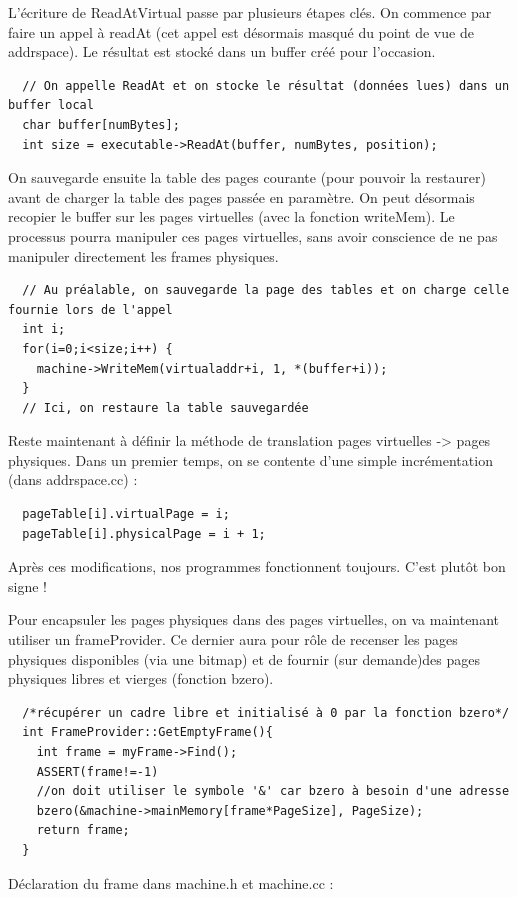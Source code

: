 \documentclass[a4paper,10pt]{article}
\begin{document}
  L'écriture de ReadAtVirtual passe par plusieurs étapes clés. On commence par faire un appel à readAt (cet appel est désormais masqué du point de vue de addrspace). Le résultat est stocké dans un buffer créé pour l'occasion.

  \begin{lstlisting}
  // On appelle ReadAt et on stocke le résultat (données lues) dans un buffer local
  char buffer[numBytes];
  int size = executable->ReadAt(buffer, numBytes, position);
  \end{lstlisting}

  On sauvegarde ensuite la table des pages courante (pour pouvoir la restaurer) avant de charger la table des pages passée en paramètre. On peut désormais recopier le buffer sur les pages virtuelles (avec la fonction writeMem). Le processus pourra manipuler ces pages virtuelles, sans avoir conscience de ne pas manipuler directement les frames physiques.

  \begin{lstlisting}
  // Au préalable, on sauvegarde la page des tables et on charge celle fournie lors de l'appel
  int i;
  for(i=0;i<size;i++) {
    machine->WriteMem(virtualaddr+i, 1, *(buffer+i));
  }
  // Ici, on restaure la table sauvegardée
  \end{lstlisting}

  Reste maintenant à définir la méthode de translation pages virtuelles -> pages physiques. Dans un premier temps, on se contente d'une simple incrémentation (dans addrspace.cc) :

  \begin{lstlisting}
  pageTable[i].virtualPage = i;
  pageTable[i].physicalPage = i + 1;
  \end{lstlisting}

  Après ces modifications, nos programmes fonctionnent toujours. C'est plutôt bon signe !

  Pour encapsuler les pages physiques dans des pages virtuelles, on va maintenant utiliser un frameProvider. Ce dernier aura pour rôle de recenser les pages physiques disponibles (via une bitmap) et de fournir (sur demande)des pages physiques libres et vierges (fonction bzero).

  \begin{lstlisting}
  /*récupérer un cadre libre et initialisé à 0 par la fonction bzero*/
  int FrameProvider::GetEmptyFrame(){
    int frame = myFrame->Find();
    ASSERT(frame!=-1)
    //on doit utiliser le symbole '&' car bzero à besoin d'une adresse
    bzero(&machine->mainMemory[frame*PageSize], PageSize);
    return frame;
  }
  \end{lstlisting}
  \newpage
  Déclaration du frame dans machine.h et machine.cc :
\end{document}
